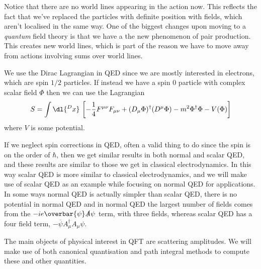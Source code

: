 \documentclass[fleqn]{NotesClass}
\newcommand{\diracadjoint}[1]{\overbar{#1}}
\newcommand{\covariantDerivative}{D}
\newcommand{\hermit}{\dagger}
\begin{document}
    Notice that there are no world lines appearing in the action now.
    This reflects the fact that we've replaced the particles with definite position with fields, which aren't localised in the same way.
    One of the biggest changes upon moving to a \emph{quantum} field theory is that we have a the new phenomenon of pair production.
    This creates new world lines, which is part of the reason we have to move away from actions involving sums over world lines.
    
    We use the Dirac Lagrangian in QED since we are mostly interested in electrons, which are spin \(1/2\) particles.
    If instead we have a spin 0 particle with complex scalar field \(\Phi\) then we can use the  Lagrangian
    \begin{equation}
        S = \int \dl{^Dx} \, \left[ -\frac{1}{4}F^{\mu\nu}F_{\mu\nu} + (\covariantDerivative_\mu \Phi)^\hermit (\covariantDerivative^\mu \Phi) - m^2 \Phi^\hermit \Phi - V(\Phi) \right]
    \end{equation}
    where \(V\) is some potential.
    
    If we neglect spin corrections in QED, often a valid thing to do since the spin is on the order of \(\hbar\), then we get similar results in both normal and scalar QED, and these results are similar to those we get in classical electrodynamics.
    In this way scalar QED is more similar to classical electrodynamics, and we will make use of scalar QED as an example while focusing on normal QED for applications.
    In some ways normal QED is actually simpler than scalar QED, there is no potential in normal QED and in normal QED the largest number of fields comes from the \(-ie\diracadjoint{\psi}\slashed{A}\psi\) term, with three fields, whereas scalar QED has a four field term, \(-\diracadjoint{\psi}A_\mu^\hermit A_\mu \psi\).
    
    The main objects of physical interest in QFT are scattering amplitudes.
    We will make use of both canonical quantisation and path integral methods to compute these and other quantities.
    
\end{document}
